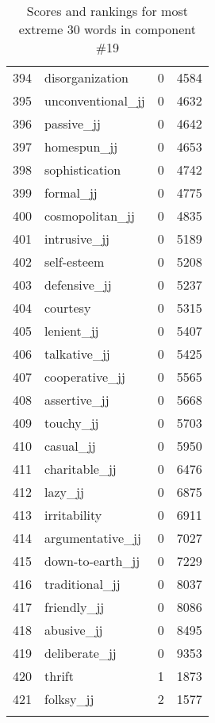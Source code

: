 \begin{longtable}[!htbp]{| rlr@{.}l |}
    394 & disorganization & 0 & 4584 \\
    395 & unconventional\_jj & 0 & 4632 \\
    396 & passive\_jj & 0 & 4642 \\
    397 & homespun\_jj & 0 & 4653 \\
    398 & sophistication & 0 & 4742 \\
    399 & formal\_jj & 0 & 4775 \\
    400 & cosmopolitan\_jj & 0 & 4835 \\
    401 & intrusive\_jj & 0 & 5189 \\
    402 & self-esteem & 0 & 5208 \\
    403 & defensive\_jj & 0 & 5237 \\
    404 & courtesy & 0 & 5315 \\
    405 & lenient\_jj & 0 & 5407 \\
    406 & talkative\_jj & 0 & 5425 \\
    407 & cooperative\_jj & 0 & 5565 \\
    408 & assertive\_jj & 0 & 5668 \\
    409 & touchy\_jj & 0 & 5703 \\
    410 & casual\_jj & 0 & 5950 \\
    411 & charitable\_jj & 0 & 6476 \\
    412 & lazy\_jj & 0 & 6875 \\
    413 & irritability & 0 & 6911 \\
    414 & argumentative\_jj & 0 & 7027 \\
    415 & down-to-earth\_jj & 0 & 7229 \\
    416 & traditional\_jj & 0 & 8037 \\
    417 & friendly\_jj & 0 & 8086 \\
    418 & abusive\_jj & 0 & 8495 \\
    419 & deliberate\_jj & 0 & 9353 \\
    420 & thrift & 1 & 1873 \\
    421 & folksy\_jj & 2 & 1577 \\
    \hline
    \caption{Scores and rankings for most extreme 30 words in component \#19} \\
\end{longtable}
